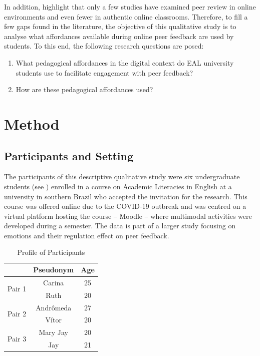 \documentclass[english]{textolivre}
\begin{document}
In addition, \textcite{payant2022learners} highlight that only a few studies have examined peer review in online environments and even fewer in authentic online classrooms. Therefore, to fill a few gaps found in the literature, the objective of this qualitative study is to analyse what affordances available during online peer feedback are used by students. To this end, the following research questions are posed:

\begin{enumerate}
    \item What pedagogical affordances in the digital context do EAL university students use to facilitate engagement with peer feedback?
    \item How are these pedagogical affordances used?
\end{enumerate}

\section{Method}

\subsection{Participants and Setting}

The participants of this descriptive qualitative study were six undergraduate students (see ) enrolled in a course on Academic Literacies in English at a university in southern Brazil who accepted the invitation for the research. This course was offered online due to the COVID-19 outbreak and was centred on a virtual platform hosting the course – Moodle – where multimodal activities were developed during a semester. The data is part of a larger study focusing on emotions and their regulation effect on peer feedback.


\begin{table}[h!]
\centering
\begin{threeparttable}
\caption{Profile of Participants}
\label{tab1}
\begin{tabular}{ccc}
\toprule
\multicolumn{1}{l}{}    & Pseudonym & Age \\
\midrule
\multirow{2}{*}{Pair 1} & Carina    & 25  \\
                        & Ruth      & 20  \\[1ex]
\multirow{2}{*}{Pair 2} & Andrômeda & 27  \\
                        & Vítor\footnotemark & 20  \\[1ex]
\multirow{2}{*}{Pair 3} & Mary Jay  & 20  \\
                        & Jay       & 21 \\
\bottomrule
\end{tabular}
\end{threeparttable}
\end{table}
\end{document}
